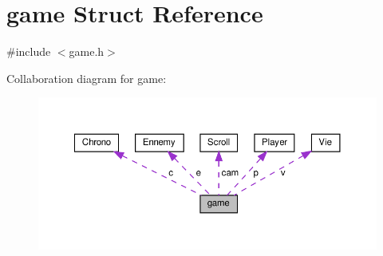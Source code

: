 \hypertarget{structgame}{}\section{game Struct Reference}
\label{structgame}


{\ttfamily \#include $<$game.\+h$>$}



Collaboration diagram for game\+:\nopagebreak
\begin{figure}[H]
\begin{center}
\leavevmode
\includegraphics[width=350pt]{structgame__coll__graph}
\end{center}
\end{figure}
